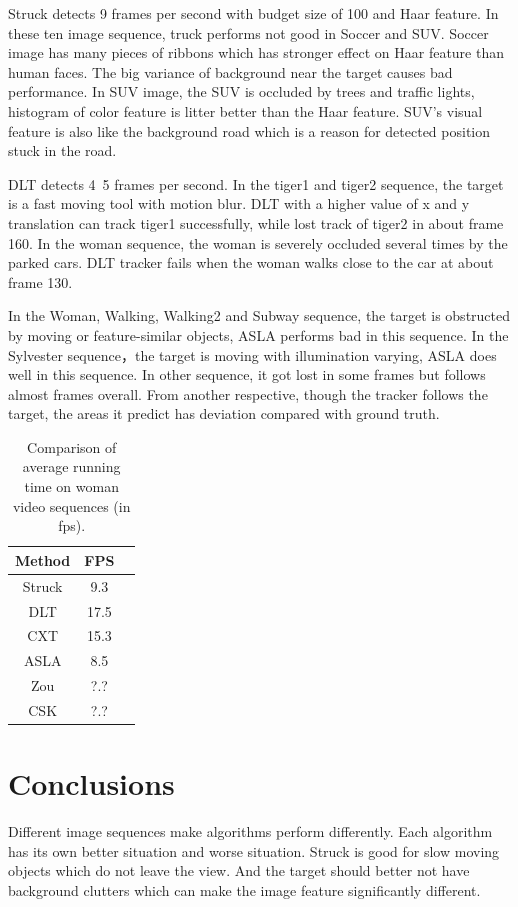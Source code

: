 \documentclass{acm_proc_article-sp}
\begin{document}
Struck detects 9 frames per second with budget size of 100 and Haar feature.
In these ten image sequence, truck performs not good in Soccer and SUV.
Soccer image has many pieces of ribbons which has stronger effect on Haar feature than human faces.
The big variance of background near the target causes bad performance.
In SUV image, the SUV is occluded by trees and traffic lights, histogram of color feature is litter better than the Haar feature.
SUV's visual feature is also like the background road which is a reason for detected position stuck in the road.

DLT detects 4~5 frames per second. In the tiger1 and tiger2 sequence, the target is a fast moving tool with motion blur. DLT with a higher value of x and y translation can track tiger1 successfully, while lost track of tiger2 in about frame 160. In the woman sequence, the woman is severely occluded several times by the parked cars. DLT tracker fails when the woman walks close to the car at about frame 130.

In the Woman, Walking, Walking2 and Subway sequence, the target is obstructed by moving or feature-similar objects, ASLA performs bad in this sequence. In the Sylvester sequence，the target is moving with illumination varying, ASLA does well in this sequence. In other sequence, it got lost in some frames but follows almost frames overall. From another respective,  though the tracker follows the target, the areas it predict has deviation compared with ground truth.

\begin{table}
	\centering
	\begin{tabular}{|c|c|l|} \hline
		Method & FPS\\ \hline
		Struck & 9.3\\ \hline
		DLT & 17.5\\ \hline
		CXT & 15.3\\ \hline
		ASLA & 8.5\\ \hline
		Zou & ?.?\\ \hline
		CSK & ?.?\\ \hline
	\end{tabular}
	\caption{Comparison of average running time on woman video sequences (in fps).}
\end{table}

\section{Conclusions}
Different image sequences make algorithms perform differently.
Each algorithm has its own better situation and worse situation.
Struck is good for slow moving objects which do not leave the view. And the target should better not have background clutters which can make the image feature significantly different.
\end{document}
